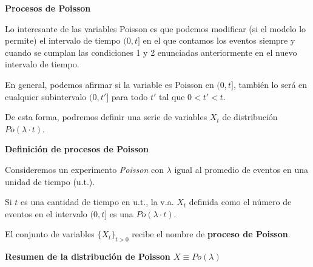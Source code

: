 \documentclass[]{book}
\begin{document}
\textbf{Procesos de Poisson}

Lo interesante de las variables Poisson es que podemos modificar (si el modelo lo permite) el intervalo de tiempo \((0,t]\) en el que contamos los eventos siempre y cuando se cumplan las condiciones 1 y 2 enunciadas anteriormente en el nuevo intervalo de tiempo.

En general, podemos afirmar si la variable es Poisson en \((0,t]\), también lo será en cualquier subintervalo \((0,t']\) para todo \(t'\) tal que \(0<t'<t\).

De esta forma, podremos definir una serie de variables \(X_t\) de distribución \(Po(\lambda\cdot t)\).

 \textbf{Definición de procesos de Poisson}

Consideremos un experimento \emph{Poisson} con \(\lambda\) igual
al promedio de eventos en una unidad de tiempo (u.t.).

Si \(t\) es una cantidad de tiempo en u.t., la v.a. \(X_{t}\) definida como el número de eventos en el intervalo \((0,t]\) es una \(Po(\lambda\cdot t)\).

El conjunto de variables \(\{X_t\}_{t>0}\) recibe el nombre de \textbf{proceso de Poisson}.

\textbf{Resumen de la distribución de Poisson \(X\equiv Po(\lambda)\)}
\end{document}
